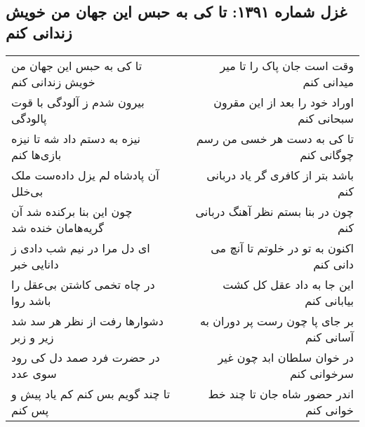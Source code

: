 \begin{center}
\section*{غزل شماره ۱۳۹۱: تا کی به حبس این جهان من خویش زندانی کنم}
\label{sec:1391}
\begin{longtable}{l p{0.5cm} r}
تا کی به حبس این جهان من خویش زندانی کنم
&&
وقت است جان پاک را تا میر میدانی کنم
\\
بیرون شدم ز آلودگی با قوت پالودگی
&&
اوراد خود را بعد از این مقرون سبحانی کنم
\\
نیزه به دستم داد شه تا نیزه بازی‌ها کنم
&&
تا کی به دست هر خسی من رسم چوگانی کنم
\\
آن پادشاه لم یزل داده‌ست ملک بی‌خلل
&&
باشد بتر از کافری گر یاد دربانی کنم
\\
چون این بنا برکنده شد آن گریه‌هامان خنده شد
&&
چون در بنا بستم نظر آهنگ دربانی کنم
\\
ای دل مرا در نیم شب دادی ز دانایی خبر
&&
اکنون به تو در خلوتم تا آنچ می دانی کنم
\\
در چاه تخمی کاشتن بی‌عقل را باشد روا
&&
این جا به داد عقل کل کشت بیابانی کنم
\\
دشوارها رفت از نظر هر سد شد زیر و زبر
&&
بر جای پا چون رست پر دوران به آسانی کنم
\\
در حضرت فرد صمد دل کی رود سوی عدد
&&
در خوان سلطان ابد چون غیر سرخوانی کنم
\\
تا چند گویم بس کنم کم یاد پیش و پس کنم
&&
اندر حضور شاه جان تا چند خط خوانی کنم
\\
\end{longtable}
\end{center}
